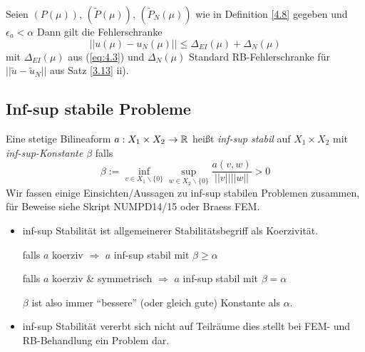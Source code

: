 \begin{kor}[EI-RB Fehlerschranke]
Seien $(P(\mu))$, $(\tilde{P}(\mu))$, $(\tilde{P}_N(\mu))$ wie in Definition \ref{4.8} gegeben und $\epsilon_a < \alpha$ Dann gilt die Fehlerschranke
\[
	||u(\mu) - u_N(\mu) || \leq \Delta_{EI} (\mu) + \Delta_N (\mu)
\]
mit $\Delta_{EI} (\mu)$ aus (\ref{eq:4.3}) und $\Delta_N(\mu)$ Standard RB-Fehlerschranke für $||\tilde{u} - \tilde{u}_N||$ aus Satz \ref{3.13} ii).
\end{kor}

\subsection{Inf-sup stabile Probleme}

\begin{defn}
Eine stetige Bilineaform $a: X_1 \times X_2 \rightarrow \mathbb{R}$ heißt \emph{inf-sup stabil} auf $X_1 \times X_2$ mit \emph{inf-sup-Konstante} $\beta$ falls
\[
	\beta := \inf\limits_{v \in X_1 \backslash \{0\}} \sup\limits_{w \in X_2 \backslash \{0\}} \frac{a(v,w)}{||v|| ||w||} > 0
\]
Wir fassen einige Einsichten/Aussagen zu inf-sup stabilen Problemen zusammen, für Beweise siehe Skript NUMPD14/15 oder Braess FEM.
\end{defn}

\begin{bem} \beginwithlistbem
\begin{itemize}
	\item inf-sup Stabilität ist allgemeinerer Stabilitätsbegriff als Koerzivität.
	
	falls $a$ koerziv $\Rightarrow$ $a$ inf-sup stabil mit $\beta \geq \alpha$
	
	falls $a$ koerziv \& symmetrisch $\Rightarrow$ $a$ inf-sup stabil mit $\beta = \alpha$
	
	$\beta$ ist also immer ``bessere'' (oder gleich gute) Konstante als $\alpha$.
	\item inf-sup Stabilität vererbt sich nicht auf Teilräume dies stellt bei FEM- und RB-Behandlung ein Problem dar.
\end{itemize}
\end{bem}

